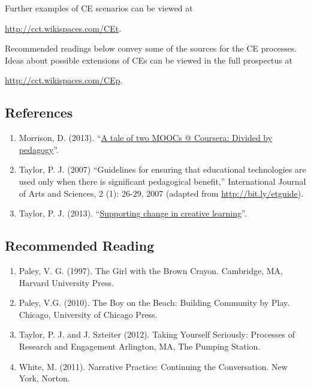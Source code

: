 Further examples of CE scenarios can be viewed at

\url{http://cct.wikispaces.com/CEt}.

Recommended readings below convey some of the sources for the CE
processes.~ Ideas about possible extensions of CEs can be viewed in the
full prospectus at

\url{http://cct.wikispaces.com/CEp}.

\hypertarget{references}{%
\subsection{References}\label{references}}

\begin{enumerate}
\def\labelenumi{\arabic{enumi}.}
\item
  Morrison, D. (2013). ``\href{http://bit.ly/164uqkJ}{A tale of two
  MOOCs @ Coursera: Divided by pedagogy}''.
\item
  Taylor, P. J. (2007) ``Guidelines for ensuring that educational
  technologies are used only when there is significant pedagogical
  benefit,'' International Journal of Arts and Sciences, 2 (1): 26-29,
  2007 (adapted from \url{http://bit.ly/etguide}).
\item
  Taylor, P. J. (2013). ``\href{http://wp.me/p1gwfa-vv}{Supporting
  change in creative learning}''.
\end{enumerate}

\hypertarget{recommended-reading}{%
\subsection{Recommended Reading}\label{recommended-reading}}

\begin{enumerate}
\def\labelenumi{\arabic{enumi}.}
\item
  Paley, V. G. (1997). The Girl with the Brown Crayon. Cambridge, MA,
  Harvard University Press.
\item
  Paley, V.G. (2010). The Boy on the Beach: Building Community by Play.
  Chicago, University of Chicago Press.
\item
  Taylor, P. J. and J. Szteiter (2012). Taking Yourself Seriously:
  Processes of Research and Engagement Arlington, MA, The Pumping
  Station.
\item
  White, M. (2011). Narrative Practice: Continuing the Conversation. New
  York, Norton.
\end{enumerate}
